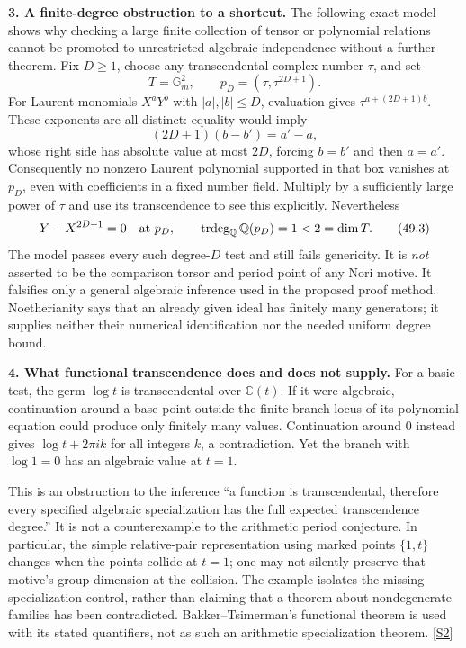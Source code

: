 \documentclass[11pt,a4paper]{article}
\newcommand{\Q}{\mathbb{Q}}
\newcommand{\C}{\mathbb{C}}
\newcommand{\sref}[2]{\hyperlink{source:#1:#2}{[S#2]}}
\numberwithin{equation}{section}
\begin{document}
\textbf{3. A finite-degree obstruction to a shortcut.}
The following exact model shows why checking a large finite collection
of tensor or polynomial relations cannot be promoted to unrestricted
algebraic independence without a further theorem. Fix $D\ge1$, choose
any transcendental complex number $\tau$, and set
\[
 T=\mathbb G_m^2,\qquad
 p_D=(\tau,\tau^{2D+1}).
\]
For Laurent monomials $X^aY^b$ with $|a|,|b|\le D$, evaluation gives
$\tau^{a+(2D+1)b}$. These exponents are all distinct: equality would
imply
\[
 (2D+1)(b-b')=a'-a,
\]
whose right side has absolute value at most $2D$, forcing $b=b'$ and then
$a=a'$. Consequently no nonzero Laurent polynomial supported in that box
vanishes at $p_D$, even with coefficients in a fixed number field. Multiply
by a sufficiently large power of $\tau$ and use its transcendence to see
this explicitly. Nevertheless
\[
 Y-X^{2D+1}=0\quad\hbox{at }p_D,\qquad
 \operatorname{trdeg}_{\Q}\Q(p_D)=1<2=\dim T.
 \tag{49.3}
\]
The model passes every such degree-$D$ test and still fails genericity.
It is \emph{not} asserted to be the comparison torsor and period point
of any Nori motive. It falsifies only a general algebraic inference used
in the proposed proof method. Noetherianity says that an already given
ideal has finitely many generators; it supplies neither their numerical
identification nor the needed uniform degree bound.

\textbf{4. What functional transcendence does and does not supply.}
For a basic test, the germ $\log t$ is transcendental over $\C(t)$.
If it were algebraic, continuation around a base point outside the finite
branch locus of its polynomial equation could produce only finitely many
values. Continuation around $0$ instead gives $\log t+2\pi i k$ for all
integers $k$, a contradiction. Yet the branch with $\log1=0$ has an
algebraic value at $t=1$.

This is an obstruction to the inference ``a function is transcendental,
therefore every specified algebraic specialization has the full expected
transcendence degree.'' It is not a counterexample to the arithmetic period
conjecture. In particular, the simple relative-pair representation using
marked points $\{1,t\}$ changes when the points collide at $t=1$; one may
not silently preserve that motive's group dimension at the collision.
The example isolates the missing specialization control, rather than
claiming that a theorem about nondegenerate families has been contradicted.
Bakker--Tsimerman's functional theorem is used with its stated quantifiers,
not as such an arithmetic specialization theorem. \sref{49}{2}
\end{document}
